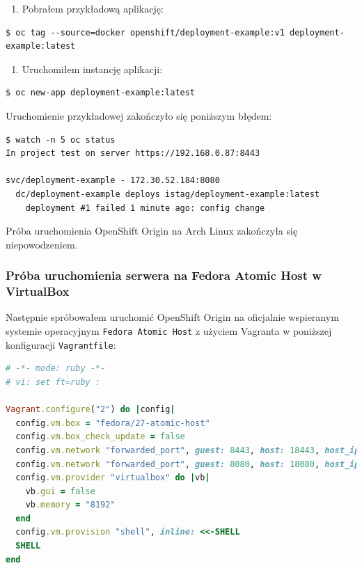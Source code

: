 \documentclass[a4paper,12pt,twoside,openany]{report}
\providecommand{\tightlist}{%
  \setlength{\itemsep}{0pt}\setlength{\parskip}{0pt}}
\newcommand{\passthrough}[1]{#1}
\begin{document}
\begin{enumerate}
\def\labelenumi{\arabic{enumi}.}
\setcounter{enumi}{2}
\tightlist
\item
  Pobrałem przykładową aplikację:
\end{enumerate}

\begin{lstlisting}
$ oc tag --source=docker openshift/deployment-example:v1 deployment-example:latest
\end{lstlisting}

\begin{enumerate}
\def\labelenumi{\arabic{enumi}.}
\setcounter{enumi}{3}
\tightlist
\item
  Uruchomiłem instancję aplikacji:
\end{enumerate}

\begin{lstlisting}
$ oc new-app deployment-example:latest
\end{lstlisting}

Uruchomienie przykładowej zakończyło się poniższym błędem:

\begin{lstlisting}
$ watch -n 5 oc status
In project test on server https://192.168.0.87:8443

svc/deployment-example - 172.30.52.184:8080
  dc/deployment-example deploys istag/deployment-example:latest 
    deployment #1 failed 1 minute ago: config change
\end{lstlisting}

Próba uruchomienia OpenShift Origin na Arch Linux zakończyła się
niepowodzeniem.

\hypertarget{pruxf3ba-uruchomienia-serwera-na-fedora-atomic-host-w-virtualbox}{%
\subsubsection{Próba uruchomienia serwera na Fedora Atomic Host w
VirtualBox}\label{pruxf3ba-uruchomienia-serwera-na-fedora-atomic-host-w-virtualbox}}

Następnie spróbowałem uruchomić OpenShift Origin na oficjalnie
wspieranym systemie operacyjnym
\passthrough{\lstinline!Fedora Atomic Host!} z użyciem Vagranta w
poniższej konfiguracji \passthrough{\lstinline!Vagrantfile!}:

\begin{lstlisting}[language=Ruby]
# -*- mode: ruby -*-
# vi: set ft=ruby :

Vagrant.configure("2") do |config|
  config.vm.box = "fedora/27-atomic-host"
  config.vm.box_check_update = false
  config.vm.network "forwarded_port", guest: 8443, host: 18443, host_ip: "127.0.0.1"
  config.vm.network "forwarded_port", guest: 8080, host: 18080, host_ip: "127.0.0.1"
  config.vm.provider "virtualbox" do |vb|
    vb.gui = false
    vb.memory = "8192"
  end
  config.vm.provision "shell", inline: <<-SHELL
  SHELL
end
\end{lstlisting}
\end{document}
